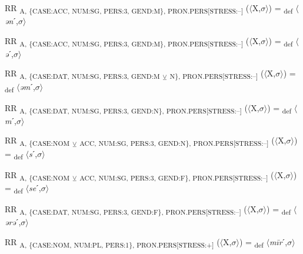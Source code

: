 {\begin{exe}
 RR \textsubscript{A, \{CASE:ACC, NUM:SG, PERS:3, GEND:M\}, PRON.PERS[STRESS:–]} ($\langle$X,$\sigma $$\rangle$) = \textsubscript{def} $\langle$\textit{ən}ˊ,$\sigma $$\rangle$
\end{exe}

\begin{exe}
 RR \textsubscript{A, \{CASE:ACC, NUM:SG, PERS:3, GEND:M\}, PRON.PERS[STRESS:–]} ($\langle$X,$\sigma $$\rangle$) = \textsubscript{def} $\langle$\textit{ə}ˊ,$\sigma $$\rangle$
\end{exe}

\begin{exe}
 RR \textsubscript{A, \{CASE:DAT, NUM:SG, PERS:3, GEND:M} \textsubscript{${\veebar}$}\textsubscript{ N\}, PRON.PERS[STRESS:–]} ($\langle$X,$\sigma $$\rangle$) = \textsubscript{def} $\langle$\textit{əm}ˊ,$\sigma $$\rangle$
\end{exe}

\begin{exe}
 RR \textsubscript{A, \{CASE:DAT, NUM:SG, PERS:3, GEND:N\}, PRON.PERS[STRESS:–]} ($\langle$X,$\sigma $$\rangle$) = \textsubscript{def} $\langle$\textit{m}ˊ,$\sigma $$\rangle$
\end{exe}

\begin{exe}
 RR \textsubscript{A, \{CASE:NOM} \textsubscript{${\veebar}$}\textsubscript{ ACC, NUM:SG, PERS:3, GEND:N\}, PRON.PERS[STRESS:–]} ($\langle$X,$\sigma $$\rangle$) = \textsubscript{def} $\langle$\textit{s}ˊ,$\sigma $$\rangle$
\end{exe}

\begin{exe}
 RR \textsubscript{A, \{CASE:NOM} \textsubscript{${\veebar}$}\textsubscript{ ACC, NUM:SG, PERS:3, GEND:F\}, PRON.PERS[STRESS:–]} ($\langle$X,$\sigma $$\rangle$) = \textsubscript{def} $\langle$\textit{se}ˊ,$\sigma $$\rangle$
\end{exe}

\begin{exe}
 RR \textsubscript{A, \{CASE:DAT, NUM:SG, PERS:3, GEND:F\}, PRON.PERS[STRESS:–]} ($\langle$X,$\sigma $$\rangle$) = \textsubscript{def} $\langle$\textit{ərə}ˊ,$\sigma $$\rangle$
\end{exe}

\begin{exe}
 RR \textsubscript{A, \{CASE:NOM, NUM:PL, PERS:1\}, PRON.PERS[STRESS:+]} ($\langle$X,$\sigma $$\rangle$) = \textsubscript{def} $\langle$\textit{m\=ir}ˊ,$\sigma $$\rangle$
\end{exe}

}
